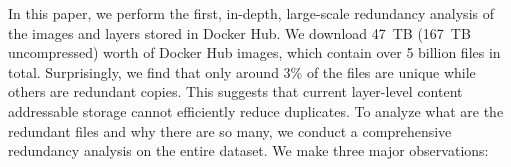 In this paper, we perform the first, in-depth, large-scale redundancy
analysis of the images and layers stored in Docker Hub.
%
We download 47~TB (167~TB uncompressed) worth of Docker Hub images,
%
which contain over 5 billion files in total.
%
%
%
%
Surprisingly, we find that only around 3\% of the files are unique
while others are redundant copies. This suggests that current layer-level content
addressable storage cannot efficiently reduce duplicates.
%
To analyze what are the redundant files and why there are so many,
we conduct a comprehensive redundancy analysis on the entire dataset.
%
We make three major observations:
%
